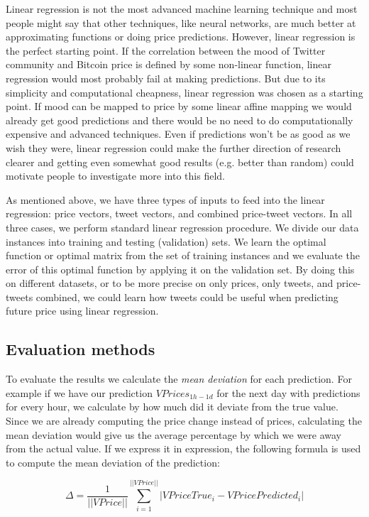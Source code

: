 \documentclass[a4paper,11pt,oneside]{article}
\begin{document}
  Linear regression is not the most advanced machine learning technique and most people might say that other techniques, like neural networks, are much better at approximating functions or doing price predictions. However, linear regression is the perfect starting point. If the correlation between the mood of Twitter community and Bitcoin price is defined by some non-linear function, linear regression would most probably fail at making predictions. But due to its simplicity and computational cheapness, linear regression was chosen as a starting point. If mood can be mapped to price by some linear affine mapping we would already get good predictions and there would be no need to do computationally expensive and advanced techniques. Even if predictions won't be as good as we wish they were, linear regression could make the further direction of research clearer and getting even somewhat good results (e.g. better than random) could motivate people to investigate more into this field. 
  
  As mentioned above, we have three types of inputs to feed into the linear regression: price vectors, tweet vectors, and combined price-tweet vectors. In all three cases, we perform standard linear regression procedure. We divide our data instances into training and testing (validation) sets. We learn the optimal function or optimal matrix from the set of training instances and we evaluate the error of this optimal function by applying it on the validation set. By doing this on different datasets, or to be more precise on only prices, only tweets, and price-tweets combined, we could learn how tweets could be useful when predicting future price using linear regression.
  
  \subsection{Evaluation methods}
  \label{resultevaluation}
  To evaluate the results we calculate the {\it mean deviation} for each prediction. For example if we have our prediction $VPrices_{1h-1d}$ for the next day with predictions for every hour, we calculate by how much did it deviate from the true value. Since we are already computing the price change instead of prices, calculating the mean deviation would give us the average percentage by which we were away from the actual value. If we express it in expression, the following formula is used to compute the mean deviation of the prediction:
  
 \begin{equation}\label{meandeviation}
 	\Delta = \frac{1}{||VPrice||} \sum_{i = 1}^{||VPrice||} |VPriceTrue_i - VPricePredicted_i|
 \end{equation}
 
\end{document}
